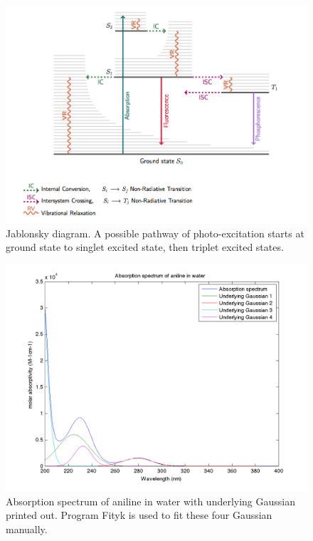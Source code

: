 \documentclass[
journal=jpcbfk, %
manuscript=article]{achemso}
\begin{document}
\begin{figure}[htb]
	\centering		
	\includegraphics[width=1\textwidth]{jablonski.png}
	\caption{Jablonsky diagram. A possible pathway of photo-excitation starts at ground state to singlet excited state, then triplet excited states.}
	\label{fig:jablonski}
\end{figure}
\begin{figure}[htb]
	\centering		
	\includegraphics[width=1\textwidth]{UVFromFityk.png}
	\caption{Absorption spectrum of aniline in water with underlying Gaussian printed out. Program Fityk is used to fit these four Gaussian manually.}
	\label{fig:UVFromFityk}
\end{figure}
\end{document}
